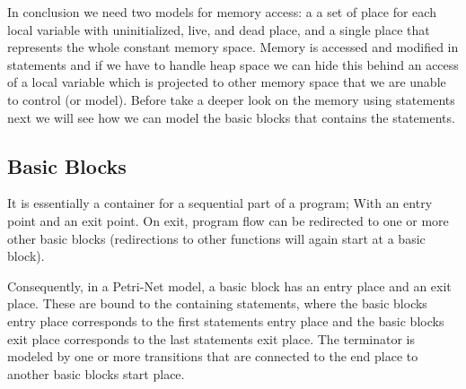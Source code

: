 In conclusion we need two models for memory access: a a set of place for each local variable with uninitialized, live, and dead place, and a single place that represents the whole constant memory space.
Memory is accessed and modified in statements and if we have to handle heap space we can hide this behind an access of a local variable which is projected to other memory space that we are unable to control (or model).
Before take a deeper look on the memory using statements next we will see how we can model the basic blocks that contains the statements.

\subsection{Basic Blocks}
It is essentially a container for a sequential part of a program; 
With an entry point and an exit point.
On exit, program flow can be redirected to one or more other basic blocks (redirections to other functions will again  start at a basic block).

Consequently, in a Petri-Net model, a basic block has an entry place and an exit place.
These are bound to the containing statements, where the basic blocks entry place corresponds to the first statements entry place and the basic blocks exit place corresponds to the last statements exit place.
The terminator is modeled by one or more transitions that are connected to the end place to another basic blocks start place.

